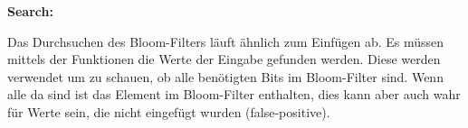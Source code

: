 \documentclass[
../AuD-Zusammenfassung.tex,
]
{subfiles}
\begin{document}
\vspace{2em}
\textbf{Search:}

Das Durchsuchen des Bloom-Filters läuft ähnlich zum Einfügen ab. Es müssen mittels der Funktionen die Werte der Eingabe gefunden werden. Diese werden verwendet um zu schauen, ob alle benötigten Bits im Bloom-Filter sind. Wenn alle da sind ist das Element im Bloom-Filter enthalten, dies kann aber auch wahr für Werte sein, die nicht eingefügt wurden (false-positive).

\begin{algorithm}[H]
\end{algorithm}
\end{document}
